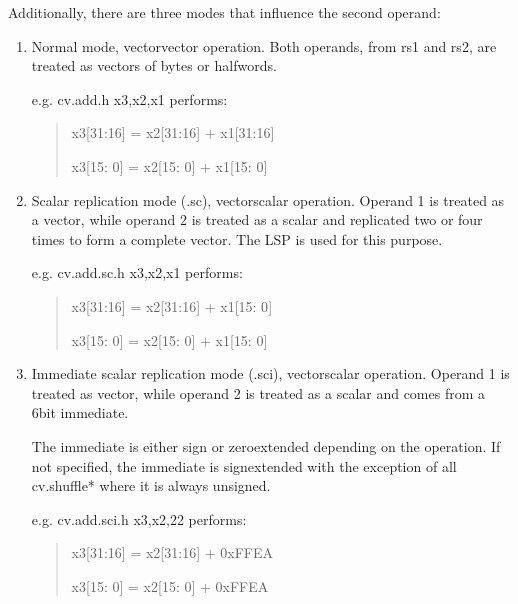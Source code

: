 \documentclass[letterpaper,10pt,english]{sphinxmanual}
\begin{document}
\sphinxAtStartPar
Additionally, there are three modes that influence the second operand:
\begin{enumerate}
%
\item {} 
\sphinxAtStartPar
Normal mode, vector\sphinxhyphen{}vector operation. Both operands, from rs1 and
rs2, are treated as vectors of bytes or half\sphinxhyphen{}words.

\sphinxAtStartPar
e.g. cv.add.h x3,x2,x1 performs:
\begin{quote}

\sphinxAtStartPar
x3{[}31:16{]} = x2{[}31:16{]} + x1{[}31:16{]}

\sphinxAtStartPar
x3{[}15: 0{]} = x2{[}15: 0{]} + x1{[}15: 0{]}
\end{quote}

\item {} 
\sphinxAtStartPar
Scalar replication mode (.sc), vector\sphinxhyphen{}scalar operation. Operand 1 is
treated as a vector, while operand 2 is treated as a scalar and
replicated two or four times to form a complete vector. The LSP is
used for this purpose.

\sphinxAtStartPar
e.g. cv.add.sc.h x3,x2,x1 performs:
\begin{quote}

\sphinxAtStartPar
x3{[}31:16{]} = x2{[}31:16{]} + x1{[}15: 0{]}

\sphinxAtStartPar
x3{[}15: 0{]} = x2{[}15: 0{]} + x1{[}15: 0{]}
\end{quote}

\item {} 
\sphinxAtStartPar
Immediate scalar replication mode (.sci), vector\sphinxhyphen{}scalar operation.
Operand 1 is treated as vector, while operand 2 is treated as a
scalar and comes from a 6\sphinxhyphen{}bit immediate.

\sphinxAtStartPar
The immediate is either sign\sphinxhyphen{} or zero\sphinxhyphen{}extended depending on the operation.
If not specified, the immediate is sign\sphinxhyphen{}extended with the exception
of all cv.shuffle* where it is always unsigned.

\sphinxAtStartPar
e.g. cv.add.sci.h x3,x2,\sphinxhyphen{}22 performs:
\begin{quote}

\sphinxAtStartPar
x3{[}31:16{]} = x2{[}31:16{]} + 0xFFEA

\sphinxAtStartPar
x3{[}15: 0{]} = x2{[}15: 0{]} + 0xFFEA
\end{quote}

\end{enumerate}
\end{document}
